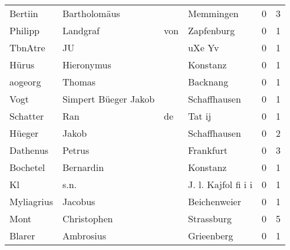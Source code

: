 \begin{center}
\begin{tiny}
\begin{longtabu}{llllrr}
                  Bertiin &                       Bartholomäus &             &                                   Memmingen &          0 &         3 \\
                  Philipp &                           Landgraf &         von &                                  Zapfenburg &          0 &         1 \\
                  TbnAtre &                                 JU &             &                                      uXe Yv &          0 &         1 \\
                    Hürus &                         Hieronymus &             &                                    Konstanz &          0 &         1 \\
                  aogeorg &                             Thomas &             &                                    Backnang &          0 &         1 \\
                     Vogt &               Simpert Büeger Jakob &             &                                Schaffhausen &          0 &         1 \\
                 Schatter &                                Ran &          de &                                      Tat ij &          0 &         1 \\
                   Hüeger &                              Jakob &             &                                Schaffhausen &          0 &         2 \\
                 Dathenus &                             Petrus &             &                                   Frankfurt &          0 &         3 \\
                 Bochetel &                          Bernardin &             &                                    Konstanz &          0 &         1 \\
                       Kl &                               s.n. &             &                         J. l. Kajfol fi i i &          0 &         1 \\
               Myliagrius &                            Jacobus &             &                                Beichenweier &          0 &         1 \\
                     Mont &                        Christophen &             &                                  Strassburg &          0 &         5 \\
                   Blarer &                          Ambrosius &             &                                  Grieenberg &          0 &         1 \\

\end{longtabu}
\end{tiny}
\end{center}
